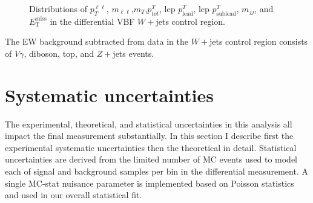 \begin{figure}[!h]
{  }\hfill
  \hfill
  \hfill
{\caption{Distributions of $p_T^{\ell\ell}$, $m_{\ell\ell}$,$m_T$,$p^T_{tot}$, lep $p^T_{\text{lead}}$, lep $p^T_{\text{sublead}}$, $m_{jj}$, and $\ensuremath{E_{\text{T}}^{\text{miss}}}$ in the differential VBF $W+$jets control region.
\label{fig:WCR}}}
\end{figure}  

The EW background subtracted from data in the $W+$jets control region consists of $V\gamma$, diboson, top, and $Z+$jets events. 

\section{Systematic uncertainties}
The experimental, theoretical, and statistical uncertainties in this analysis all impact the final measurement substantially. In this section I describe first the experimental systematic uncertainties then the theoretical in detail. Statistical uncertainties are derived from the limited number of MC events used to model each of signal and background samples per bin in the differential measurement. A single MC-stat nuisance parameter is implemented based on Poisson statistics and used in our overall statistical fit. 

